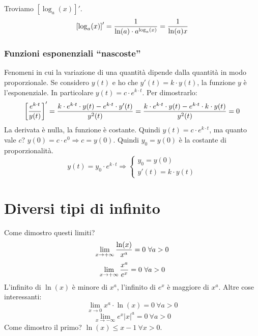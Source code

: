 \documentclass[12pt,a4paper]{article}
\begin{document}
Troviamo $ \left[ \log_a(x) \right]' $.
$$
\left[ \log_a(x) \right]' = {1 \over \ln(a) \cdot a^{\log_a(x)}} =
{1 \over \ln(a) x}
$$

\subsubsection{Funzioni esponenziali ``nascoste''}
Fenomeni in cui la variazione di una quantit\`a dipende dalla quantit\`a
in modo proporzionale. Se considero $y(t)$ e ho che $y'(t) = k \cdot y(t)$,
la funzione $y$ \`e l'esponenziale. In particolare $y(t) = c \cdot 
e^{k \cdot t}$. Per dimostrarlo:
$$
\left[ {e^{k \cdot t} \over y(t)} \right]' = 
{k \cdot e^{k \cdot t} \cdot y(t) - e^{k \cdot t} \cdot y'(t) \over y^2(t)} =
{k \cdot e^{k \cdot t} \cdot y(t) - e^{k \cdot t} \cdot k \cdot y(t)
\over y^2(t)} = 0
$$
La derivata \`e nulla, la funzione \`e costante. Quindi $ y(t) = c \cdot
e^{k \cdot t}$, ma quanto vale $c$? $y(0) = c \cdot e^0 \Rightarrow
c = y(0)$. Quindi $y_0 = y(0)$ \`e la costante di proporzionalit\`a.
$$
y(t) = y_0 \cdot e^{k \cdot t} \Rightarrow
\begin{cases} y_0 = y(0) \\
y'(t) = k \cdot y(t) \end{cases}
$$

\newpage
\section{Diversi tipi di infinito}
\label{infiniti} Come dimostro questi limiti?
$$ \lim_{x \to +\infty} {\ln(x) \over x^a} = 0 \ \forall a > 0 $$
$$ \lim_{x \to +\infty} {x^a \over e^x} = 0 \ \forall a > 0 $$
L'infinito di $\ln(x)$ \`e minore di $x^a$, l'infinito di $e^x$ \`e
maggiore di $x^a$. Altre cose interessanti:
$$ \lim_{x \to 0} x^a \cdot \ln(x) = 0 \ \forall a > 0 $$
$$ \lim_{x \to -\infty} e^x {|x|}^a = 0 \ \forall a > 0 $$
Come dimostro il primo? $ \ln(x) \leq x-1 \ \forall x > 0$.

\begin{center}
\end{center}
\end{document}
